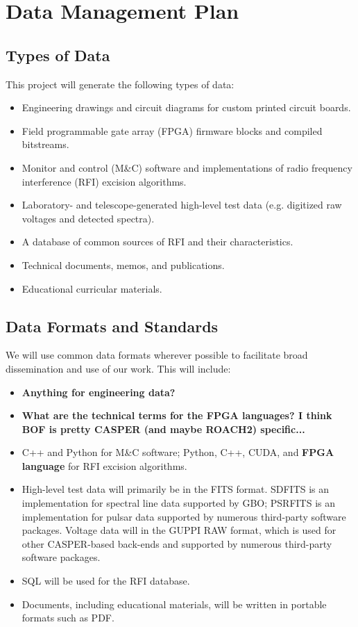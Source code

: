 \documentclass[10pt]{NSF}
\begin{document}
\section{Data Management Plan}
\label{sec:data_plan}

\subsection{Types of Data}

This project will generate the following types of data:
\begin{itemize}
\item{Engineering drawings and circuit diagrams for custom printed
  circuit boards.}
\item{Field programmable gate array (FPGA) firmware blocks and
  compiled bitstreams.}
\item{Monitor and control (M\&C) software and implementations of radio
  frequency interference (RFI) excision algorithms.}
\item{Laboratory- and telescope-generated high-level test data
  (e.g. digitized raw voltages and detected spectra).}
\item{A database of common sources of RFI and their characteristics.}
\item{Technical documents, memos, and publications.}
\item{Educational curricular materials.}
\end{itemize}

\subsection{Data Formats and Standards}

We will use common data formats wherever possible to facilitate broad
dissemination and use of our work.  This will include:
\begin{itemize}
\item{\textbf{Anything for engineering data?}}
\item{\textbf{What are the technical terms for the FPGA languages?  I
    think BOF is pretty CASPER (and maybe ROACH2) specific...}}
\item{C++ and Python for M\&C software; Python, C++, CUDA, and
  \textbf{FPGA language} for RFI excision algorithms.}
\item{High-level test data will primarily be in the FITS format.
  SDFITS is an implementation for spectral line data supported by GBO;
  PSRFITS is an implementation for pulsar data supported by numerous
  third-party software packages.  Voltage data will in the GUPPI RAW
  format, which is used for other CASPER-based back-ends and supported
  by numerous third-party software packages.}
\item{SQL will be used for the RFI database.}
\item{Documents, including educational materials, will be written in
  portable formats such as PDF.}
\end{itemize}
\end{document}
